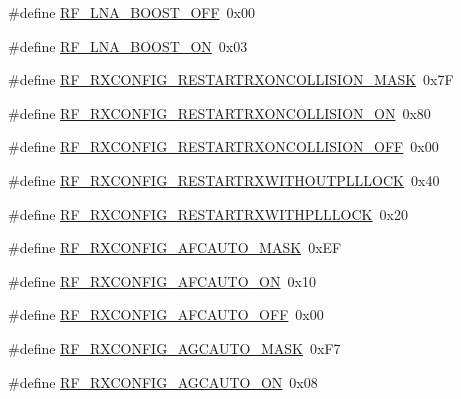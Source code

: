 \begin{DoxyCompactItemize}
\item 
\#define \mbox{\hyperlink{sx1276_regs-_fsk_8h_a83f435e55a947239e4b0a971e57384fb}{R\+F\+\_\+\+L\+N\+A\+\_\+\+B\+O\+O\+S\+T\+\_\+\+O\+FF}}~0x00
\item 
\#define \mbox{\hyperlink{sx1276_regs-_fsk_8h_ae729805f23edcd913b0442e569f6b151}{R\+F\+\_\+\+L\+N\+A\+\_\+\+B\+O\+O\+S\+T\+\_\+\+ON}}~0x03
\item 
\#define \mbox{\hyperlink{sx1276_regs-_fsk_8h_a5100d76c88dbc8760a74597f945b585c}{R\+F\+\_\+\+R\+X\+C\+O\+N\+F\+I\+G\+\_\+\+R\+E\+S\+T\+A\+R\+T\+R\+X\+O\+N\+C\+O\+L\+L\+I\+S\+I\+O\+N\+\_\+\+M\+A\+SK}}~0x7F
\item 
\#define \mbox{\hyperlink{sx1276_regs-_fsk_8h_ab12ed62cd3ca3d4a4d04717f4e4e1c6e}{R\+F\+\_\+\+R\+X\+C\+O\+N\+F\+I\+G\+\_\+\+R\+E\+S\+T\+A\+R\+T\+R\+X\+O\+N\+C\+O\+L\+L\+I\+S\+I\+O\+N\+\_\+\+ON}}~0x80
\item 
\#define \mbox{\hyperlink{sx1276_regs-_fsk_8h_adcb2e2a2c6ddefb70fa9d95b4091dfbc}{R\+F\+\_\+\+R\+X\+C\+O\+N\+F\+I\+G\+\_\+\+R\+E\+S\+T\+A\+R\+T\+R\+X\+O\+N\+C\+O\+L\+L\+I\+S\+I\+O\+N\+\_\+\+O\+FF}}~0x00
\item 
\#define \mbox{\hyperlink{sx1276_regs-_fsk_8h_afe5d2d617bc8305d563ddf6bdf6f525b}{R\+F\+\_\+\+R\+X\+C\+O\+N\+F\+I\+G\+\_\+\+R\+E\+S\+T\+A\+R\+T\+R\+X\+W\+I\+T\+H\+O\+U\+T\+P\+L\+L\+L\+O\+CK}}~0x40
\item 
\#define \mbox{\hyperlink{sx1276_regs-_fsk_8h_a89ca1a06f70efe28c16331278cfb2e55}{R\+F\+\_\+\+R\+X\+C\+O\+N\+F\+I\+G\+\_\+\+R\+E\+S\+T\+A\+R\+T\+R\+X\+W\+I\+T\+H\+P\+L\+L\+L\+O\+CK}}~0x20
\item 
\#define \mbox{\hyperlink{sx1276_regs-_fsk_8h_aad8947af15105d6b90d75d761439aa23}{R\+F\+\_\+\+R\+X\+C\+O\+N\+F\+I\+G\+\_\+\+A\+F\+C\+A\+U\+T\+O\+\_\+\+M\+A\+SK}}~0x\+EF
\item 
\#define \mbox{\hyperlink{sx1276_regs-_fsk_8h_a1565ab71874bf162f92304ed92a3560c}{R\+F\+\_\+\+R\+X\+C\+O\+N\+F\+I\+G\+\_\+\+A\+F\+C\+A\+U\+T\+O\+\_\+\+ON}}~0x10
\item 
\#define \mbox{\hyperlink{sx1276_regs-_fsk_8h_a46775e0fe6e7798c4f50aa1527a5e454}{R\+F\+\_\+\+R\+X\+C\+O\+N\+F\+I\+G\+\_\+\+A\+F\+C\+A\+U\+T\+O\+\_\+\+O\+FF}}~0x00
\item 
\#define \mbox{\hyperlink{sx1276_regs-_fsk_8h_a20bbc62b9e34c66596d9152d8d1c18ac}{R\+F\+\_\+\+R\+X\+C\+O\+N\+F\+I\+G\+\_\+\+A\+G\+C\+A\+U\+T\+O\+\_\+\+M\+A\+SK}}~0x\+F7
\item 
\#define \mbox{\hyperlink{sx1276_regs-_fsk_8h_a6d9c9a618b195915a59cfffeae490a76}{R\+F\+\_\+\+R\+X\+C\+O\+N\+F\+I\+G\+\_\+\+A\+G\+C\+A\+U\+T\+O\+\_\+\+ON}}~0x08

\end{DoxyCompactItemize}
